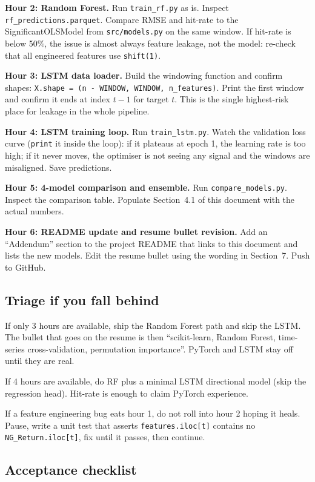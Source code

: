 \documentclass[11pt,letterpaper]{article}
\begin{document}
\textbf{Hour 2: Random Forest.} Run \texttt{train\_rf.py} as is. Inspect \texttt{rf\_predictions.parquet}. Compare RMSE and hit-rate to the SignificantOLSModel from \texttt{src/models.py} on the same window. If hit-rate is below 50\%, the issue is almost always feature leakage, not the model: re-check that all engineered features use \texttt{shift(1)}.

\textbf{Hour 3: LSTM data loader.} Build the windowing function and confirm shapes: \texttt{X.shape = (n - WINDOW, WINDOW, n\_features)}. Print the first window and confirm it ends at index $t-1$ for target $t$. This is the single highest-risk place for leakage in the whole pipeline.

\textbf{Hour 4: LSTM training loop.} Run \texttt{train\_lstm.py}. Watch the validation loss curve (\texttt{print} it inside the loop): if it plateaus at epoch 1, the learning rate is too high; if it never moves, the optimiser is not seeing any signal and the windows are misaligned. Save predictions.

\textbf{Hour 5: 4-model comparison and ensemble.} Run \texttt{compare\_models.py}. Inspect the comparison table. Populate Section~4.1 of this document with the actual numbers.

\textbf{Hour 6: README update and resume bullet revision.} Add an ``Addendum'' section to the project README that links to this document and lists the new models. Edit the resume bullet using the wording in Section~7. Push to GitHub.

\subsection{Triage if you fall behind}

If only 3 hours are available, ship the Random Forest path and skip the LSTM. The bullet that goes on the resume is then ``scikit-learn, Random Forest, time-series cross-validation, permutation importance''. PyTorch and LSTM stay off until they are real.

If 4 hours are available, do RF plus a minimal LSTM directional model (skip the regression head). Hit-rate is enough to claim PyTorch experience.

If a feature engineering bug eats hour 1, do not roll into hour 2 hoping it heals. Pause, write a unit test that asserts \texttt{features.iloc[t]} contains no \texttt{NG\_Return.iloc[t]}, fix until it passes, then continue.

\subsection{Acceptance checklist}
\end{document}
